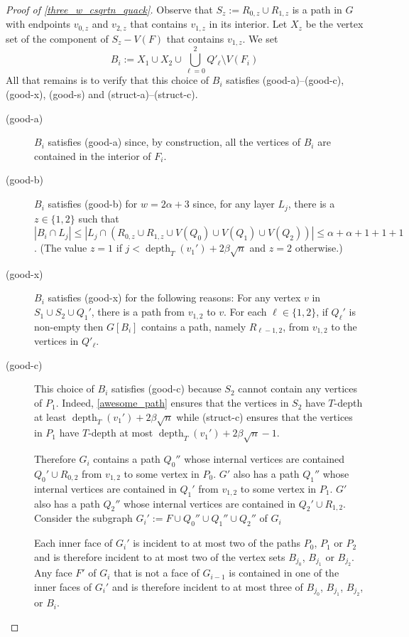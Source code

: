 \documentclass{patmorin}
\DeclareMathOperator{\depth}{depth}
\begin{document}
\begin{proof}[Proof of \cref{three_w_csqrtn_quack}]
  Observe that $S_{z} := R_{0,z}\cup R_{1,z}$ is a path in $G$ with endpoints $v_{0,z}$ and $v_{2,z}$ that contains $v_{1,z}$ in its interior.  Let $X_{z}$ be the vertex set of the component of $S_{z}-V(F)$ that contains $v_{1,z}$.
  We set
  \[
     B_i := X_{1} \cup X_{2} \cup \bigcup_{\ell=0}^2 Q'_\ell\setminus V(F_i)
  \]
  All that remains is to verify that this choice of $B_i$ satisfies (good-a)--(good-c), (good-x), (good-s) and (struct-a)--(struct-c).
  \begin{description}
    \item[(good-a)] $B_i$ satisfies (good-a) since, by construction, all the vertices of $B_i$ are contained in the interior of $F_i$.

    \item[(good-b)] $B_i$ satisfies (good-b) for $w=2\alpha+3$ since, for any layer $L_j$, there is a $z\in\{1,2\}$ such that $|B_i\cap L_j|\le |L_j\cap (R_{0,z}\cup R_{1,z}\cup V(Q_0)\cup V(Q_1)\cup V(Q_2))|\le \alpha+\alpha+1+1+1$.  (The value $z=1$ if $j < \depth_T(v_1')+2\beta\sqrt{n}$ and $z=2$ otherwise.)

    \item[(good-x)] $B_i$ satisfies (good-x) for the following reasons: For any vertex $v$ in $S_1\cup S_2\cup Q_1'$, there is a path from $v_{1,2}$ to $v$.  For each $\ell\in\{1,2\}$, if $Q_\ell'$ is non-empty then $G[B_i]$ contains a path, namely $R_{\ell-1,2}$, from $v_{1,2}$ to the vertices in $Q'_\ell$.

    \item[(good-c)] This choice of $B_i$ satisfies (good-c) because $S_{2}$ cannot contain any vertices of $P_1$. Indeed, \cref{awesome_path} ensures that the vertices in $S_2$ have $T$-depth at least $\depth_T(v_1')+ 2\beta\sqrt{n}$ while (struct-c) ensures that the vertices in $P_1$ have $T$-depth at most $\depth_T(v_1')+2\beta\sqrt{n}-1$.

    Therefore $G_i$ contains a path $Q_0''$ whose internal vertices are contained $Q_0'\cup R_{0,2}$ from $v_{1,2}$ to some vertex in $P_0$.  $G'$ also has a path $Q_1''$ whose internal vertices are contained in $Q_1'$ from $v_{1,2}$ to some vertex in $P_1$.  $G'$ also has a path $Q_2''$ whose internal vertices are contained in $Q_2'\cup R_{1,2}$.  Consider the subgraph $G_i':=F\cup Q_0''\cup Q_1''\cup Q_2''$ of $G_i$

    Each inner face of $G_i'$ is incident to at most two of the paths $P_0$, $P_1$ or $P_2$ and is therefore incident to at most two of the vertex sets $B_{j_0}$, $B_{j_1}$ or $B_{j_2}$. Any face $F'$ of $G_i$ that is not a face of $G_{i-1}$ is contained in one of the inner faces of $G_i'$ and is therefore incident to at most three of $B_{j_0}$, $B_{j_1}$, $B_{j_2}$, or $B_i$.


\end{description}
\end{proof}
\end{document}
